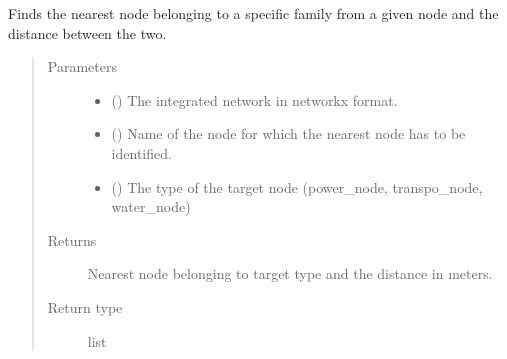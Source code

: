 \documentclass[letterpaper,10pt,english]{sphinxmanual}
\begin{document}
\begin{fulllineitems}
\label{\detokenize{apidoc:dreaminsg_integrated_model.src.network_sim_models.interdependencies.get_nearest_node}}
\sphinxAtStartPar
Finds the nearest node belonging to a specific family from a given node and the distance between the two.
\begin{quote}\begin{description}
\item[{Parameters}] \leavevmode\begin{itemize}
\item {} 
\sphinxAtStartPar
{} () \textendash{} The integrated network in networkx format.

\item {} 
\sphinxAtStartPar
{} () \textendash{} Name of the node for which the nearest node has to be identified.

\item {} 
\sphinxAtStartPar
{} () \textendash{} The type of the target node (power\_node, transpo\_node, water\_node)

\end{itemize}

\item[{Returns}] \leavevmode
\sphinxAtStartPar
Nearest node belonging to target type and the distance in meters.

\item[{Return type}] \leavevmode
\sphinxAtStartPar
list

\end{description}\end{quote}

\end{fulllineitems}
\end{document}
